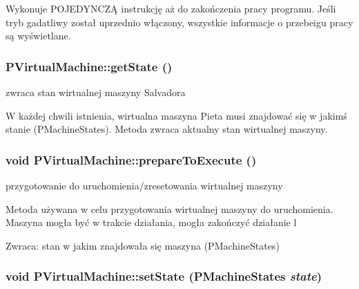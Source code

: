 Wykonuje POJEDYNCZĄ instrukcję aż do zakończenia pracy programu. Jeśli tryb gadatliwy został uprzednio włączony, wszystkie informacje o przebeigu pracy są wyświetlane. \hypertarget{classPVirtualMachine_699839f4df2106065458127c36b4bfca}{
\subsubsection[{getState}]{ PVirtualMachine::getState ()}}
\label{classPVirtualMachine_699839f4df2106065458127c36b4bfca}


zwraca stan wirtualnej maszyny Salvadora 

W każdej chwili istnienia, wirtualna maszyna Pieta musi znajdować się w jakimś stanie (PMachineStates). Metoda zwraca aktualny stan wirtualnej maszyny. \hypertarget{classPVirtualMachine_513af8673f1430cd04fd0a0e46abedd4}{
\subsubsection[{prepareToExecute}]{\setlength{\rightskip}{0pt plus 5cm}void PVirtualMachine::prepareToExecute ()}}
\label{classPVirtualMachine_513af8673f1430cd04fd0a0e46abedd4}


przygotowanie do uruchomienia/zresetowania wirtualnej maszyny 

Metoda używana w celu przygotowania wirtualnej maszyny do uruchomienia. Maszyna mogła być w trakcie działania, mogła zakończyć działanie l \begin{Desc}
\item[Zwraca:]stan w jakim znajdowała się maszyna (PMachineStates) \end{Desc}
\hypertarget{classPVirtualMachine_bede8c1e068c19b9bc61a957de70cda8}{
\subsubsection[{setState}]{\setlength{\rightskip}{0pt plus 5cm}void PVirtualMachine::setState ({\bf PMachineStates} {\em state})}}
\label{classPVirtualMachine_bede8c1e068c19b9bc61a957de70cda8}


